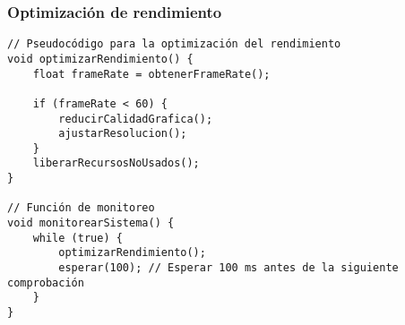 \subsubsection{Optimización de rendimiento}

\begin{verbatim}
// Pseudocódigo para la optimización del rendimiento
void optimizarRendimiento() {
    float frameRate = obtenerFrameRate();

    if (frameRate < 60) {
        reducirCalidadGrafica();
        ajustarResolucion();
    }
    liberarRecursosNoUsados();
}

// Función de monitoreo
void monitorearSistema() {
    while (true) {
        optimizarRendimiento();
        esperar(100); // Esperar 100 ms antes de la siguiente comprobación
    }
}
\end{verbatim}
